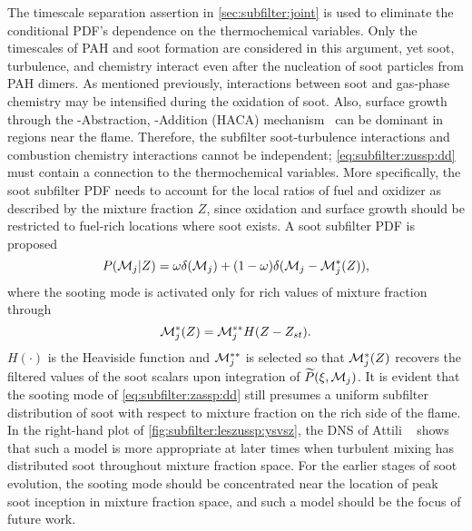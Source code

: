 The timescale separation assertion in \cref{sec:subfilter:joint} is used to eliminate the conditional PDF's dependence on the thermochemical variables. Only the timescales of PAH and soot formation are considered in this argument, yet soot, turbulence, and chemistry interact even after the nucleation of soot particles from PAH dimers. As mentioned previously, interactions between soot and gas-phase chemistry may be intensified during the oxidation of soot. Also, surface growth through the -Abstraction, -Addition (HACA) mechanism~\cite{frenklach1985,frenklach1991} can be dominant in regions near the flame. Therefore, the subfilter soot-turbulence interactions and combustion chemistry interactions cannot be independent; \cref{eq:subfilter:zussp:dd} must contain a connection to the thermochemical variables. More specifically, the soot subfilter PDF needs to account for the local ratios of fuel and oxidizer as described by the mixture fraction $Z$, since oxidation and surface growth should be restricted to fuel-rich locations where soot exists. A soot subfilter PDF is proposed
\begin{equation}\label{eq:subfilter:zassp:dd}
  P(\mathcal{M}_j|Z) = \omega\delta(\mathcal{M}_j) + (1 - \omega)\delta(\mathcal{M}_j - \mathcal{M}_j^*(Z)),
\end{equation}
where the sooting mode is activated only for rich values of mixture fraction through
\begin{equation}\label{eq:subfilter:zassp:mstar}
  \mathcal{M}_j^*(Z) = \mathcal{M}_j^{**}H(Z - Z_{st}).
\end{equation}
$H(\cdot)$ is the Heaviside function and $\mathcal{M}_j^{**}$ is selected so that $\mathcal{M}_j^*(Z)$ recovers the filtered values of the soot scalars upon integration of $\widetilde{P}(\xi,\mathcal{M}_j)$. It is evident that the sooting mode of \cref{eq:subfilter:zassp:dd} still presumes a uniform subfilter distribution of soot with respect to mixture fraction on the rich side of the flame. In the right-hand plot of \cref{fig:subfilter:leszussp:ysvsz}, the DNS of Attili \etal~\cite{attili2014} shows that such a model is more appropriate at later times when turbulent mixing has distributed soot throughout mixture fraction space. For the earlier stages of soot evolution, the sooting mode should be concentrated near the location of peak soot inception in mixture fraction space, and such a model should be the focus of future work. %

